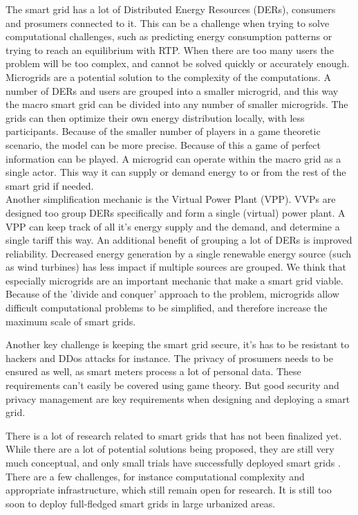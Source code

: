 The smart grid has a lot of Distributed Energy Resources (DERs), consumers and prosumers connected to it. This can be a challenge when trying to solve computational challenges, such as predicting energy consumption patterns or trying to reach an equilibrium with RTP. When there are too many users the problem will be too complex, and cannot be solved quickly or accurately enough. 
Microgrids are a potential solution to the complexity of the computations. A number of DERs and users are grouped into a smaller microgrid, and this way the macro smart grid can be divided into any number of smaller microgrids. The grids can then optimize their own energy distribution locally, with less participants. Because of the smaller number of players in a game theoretic scenario, the model can be more precise. Because of this a game of perfect information can be played.
A microgrid can operate within the macro grid as a single actor. This way it can supply or demand energy to or from the rest of the smart grid if needed.\\
Another simplification mechanic is the Virtual Power Plant (VPP). VVPs are designed too group DERs specifically and form a single (virtual) power plant. A VPP can keep track of all it's energy supply and the demand, and determine a single tariff this way. An additional benefit of grouping a lot of DERs is improved reliability. Decreased energy generation by a single renewable energy source (such as wind turbines) has less impact if multiple sources are grouped.
We think that especially microgrids are an important mechanic that make a smart grid viable. Because of the 'divide and conquer' approach to the problem, microgrids allow difficult computational problems to be simplified, and therefore increase the maximum scale of smart grids.

Another key challenge is keeping the smart grid secure, it's has to be resistant to hackers and DDos attacks for instance. The privacy of prosumers needs to be ensured as well, as smart meters process a lot of personal data. These requirements can't easily be covered using game theory. But good security and privacy management are key requirements when designing and deploying a smart grid. 

There is a lot of research related to smart grids that has not been finalized yet. While there are a lot of potential solutions being proposed, they are still very much conceptual, and only small trials have successfully deployed smart grids \cite{Kumagai2012,HatziargyriouAsanoIravaniMarnay2007}. There are a few challenges, for instance computational complexity and appropriate infrastructure, which still remain open for research. It is still too soon to deploy full-fledged smart grids in large urbanized areas.

